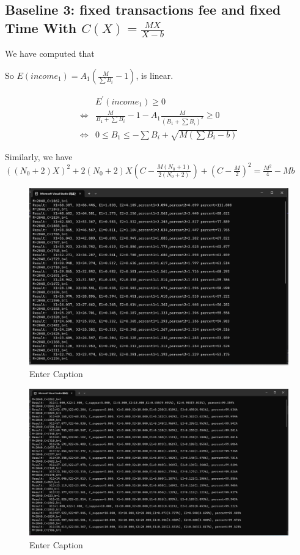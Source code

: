 \documentclass{article}
\begin{document}
\subsection{Baseline 3: fixed transactions fee and fixed Time With $C(X)=\frac{MX}{X-b}$}
We have computed that
\par So $E(income_1)=A_1(\frac{M}{\sum B_i}-1)$, is linear.
 \par
 \begin{equation}
\begin{aligned}
&E^{'}(income_1)\ge 0
\\\Longleftrightarrow&\frac{M}{B_1+\sum B_i}-1-A_1\frac{M}{(B_1+\sum B_i)^2}\ge 0
\\\Longleftrightarrow& 0 \le B_1 \le -\sum B_i+\sqrt{M(\sum B_i-b)}
\end{aligned}
\end{equation}
\par Similarly, we have $((N_0+2)X)^2+2(N_0+2)X(C-\frac{M(N_0+1)}{2(N_0+2)})+(C-\frac{M}{2})^2=\frac{M^2}{4}-Mb$
\begin{figure}
    \centering
    \includegraphics[width=1\linewidth]{5.png}
    \caption{Enter Caption}
    \label{fig:enter-label}
\end{figure}
\begin{figure}
    \centering
    \includegraphics[width=1\linewidth]{6.png}
    \caption{Enter Caption}
    \label{fig:enter-label}
\end{figure}
\end{document}
